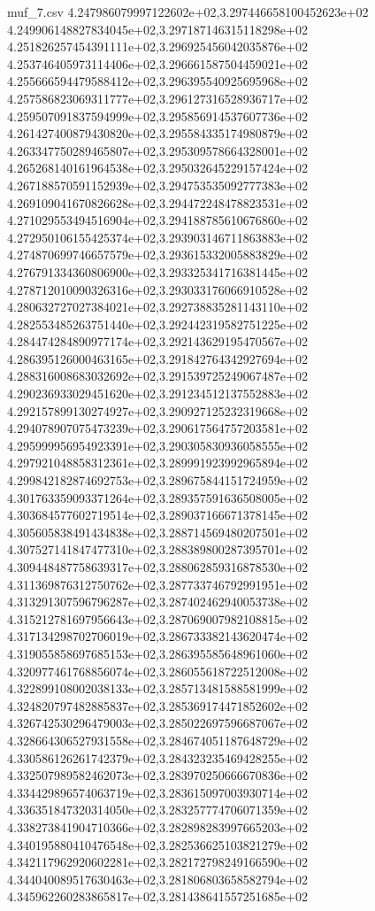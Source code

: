 \begin{filecontents*}{muf_7.csv}
4.247986079997122602e+02,3.297446658100452623e+02
4.249906148827834045e+02,3.297187146315118298e+02
4.251826257454391111e+02,3.296925456042035876e+02
4.253746405973114406e+02,3.296661587504459021e+02
4.255666594479588412e+02,3.296395540925695968e+02
4.257586823069311777e+02,3.296127316528936717e+02
4.259507091837594999e+02,3.295856914537607736e+02
4.261427400879430820e+02,3.295584335174980879e+02
4.263347750289465807e+02,3.295309578664328001e+02
4.265268140161964538e+02,3.295032645229157424e+02
4.267188570591152939e+02,3.294753535092777383e+02
4.269109041670826628e+02,3.294472248478823531e+02
4.271029553494516904e+02,3.294188785610676860e+02
4.272950106155425374e+02,3.293903146711863883e+02
4.274870699746657579e+02,3.293615332005883829e+02
4.276791334360806900e+02,3.293325341716381445e+02
4.278712010090326316e+02,3.293033176066910528e+02
4.280632727027384021e+02,3.292738835281143110e+02
4.282553485263751440e+02,3.292442319582751225e+02
4.284474284890977174e+02,3.292143629195470567e+02
4.286395126000463165e+02,3.291842764342927694e+02
4.288316008683032692e+02,3.291539725249067487e+02
4.290236933029451620e+02,3.291234512137552883e+02
4.292157899130274927e+02,3.290927125232319668e+02
4.294078907075473239e+02,3.290617564757203581e+02
4.295999956954923391e+02,3.290305830936058555e+02
4.297921048858312361e+02,3.289991923992965894e+02
4.299842182874692753e+02,3.289675844151724959e+02
4.301763359093371264e+02,3.289357591636508005e+02
4.303684577602719514e+02,3.289037166671378145e+02
4.305605838491434838e+02,3.288714569480207501e+02
4.307527141847477310e+02,3.288389800287395701e+02
4.309448487758639317e+02,3.288062859316878530e+02
4.311369876312750762e+02,3.287733746792991951e+02
4.313291307596796287e+02,3.287402462940053738e+02
4.315212781697956643e+02,3.287069007982108815e+02
4.317134298702706019e+02,3.286733382143620474e+02
4.319055858697685153e+02,3.286395585648961060e+02
4.320977461768856074e+02,3.286055618722512008e+02
4.322899108002038133e+02,3.285713481588581999e+02
4.324820797482885837e+02,3.285369174471852602e+02
4.326742530296479003e+02,3.285022697596687067e+02
4.328664306527931558e+02,3.284674051187648729e+02
4.330586126261742379e+02,3.284323235469428255e+02
4.332507989582462073e+02,3.283970250666670836e+02
4.334429896574063719e+02,3.283615097003930714e+02
4.336351847320314050e+02,3.283257774706071359e+02
4.338273841904710366e+02,3.282898283997665203e+02
4.340195880410476548e+02,3.282536625103821279e+02
4.342117962920602281e+02,3.282172798249166590e+02
4.344040089517630463e+02,3.281806803658582794e+02
4.345962260283865817e+02,3.281438641557251685e+02

\end{filecontents*}
